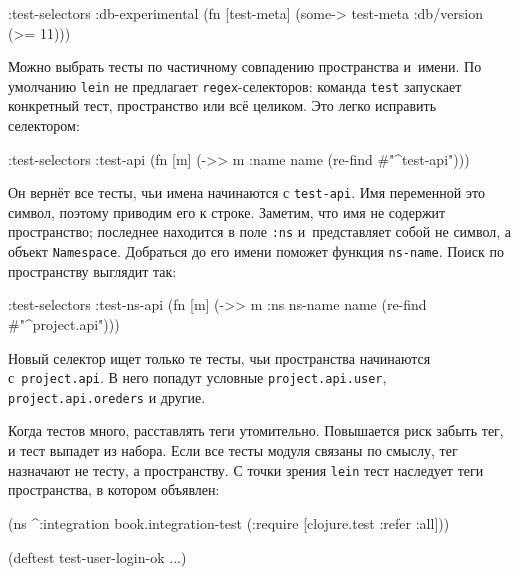 \begin{english}
  \begin{clojure}
:test-selectors {:db-experimental
                 (fn [test-meta]
                   (some-> test-meta :db/version (>= 11)))}
  \end{clojure}
\end{english}

Можно выбрать тесты по частичному совпадению пространства и~имени. По умолчанию
\verb|lein| не предлагает \verb|regex|-селекторов: команда \verb|test| запускает
конкретный тест, пространство или всё целиком. Это легко исправить селектором:

\begin{english}
  \begin{clojure}
:test-selectors {:test-api
                 (fn [m] (->> m :name name
                              (re-find #"^test-api")))}
  \end{clojure}
\end{english}

Он вернёт все тесты, чьи имена начинаются с \verb|test-api|. Имя переменной это
символ, поэтому приводим его к строке. Заметим, что имя не содержит
пространство; последнее находится в поле \verb|:ns| и~представляет собой не
символ, а объект \verb|Namespace|. Добраться до его имени поможет функция
\verb|ns-name|. Поиск по пространству выглядит так:


\begin{english}
  \begin{clojure}
:test-selectors {:test-ns-api
                 (fn [m] (->> m :ns ns-name name
                              (re-find #"^project.api")))}
  \end{clojure}
\end{english}

Новый селектор ищет только те тесты, чьи пространства начинаются
с~\verb|project.api|. В него попадут условные \verb|project.api.user|,
\verb|project.api.oreders| и другие.

Когда тестов много, расставлять теги утомительно. Повышается риск забыть тег, и
тест выпадет из набора. Если все тесты модуля связаны по смыслу, тег назначают
не тесту, а пространству. С точки зрения \verb|lein| тест наследует теги
пространства, в котором объявлен:

\begin{english}
  \begin{clojure}
(ns ^:integration
  book.integration-test
  (:require [clojure.test :refer :all]))

(deftest test-user-login-ok
  ...)
  \end{clojure}
\end{english}

